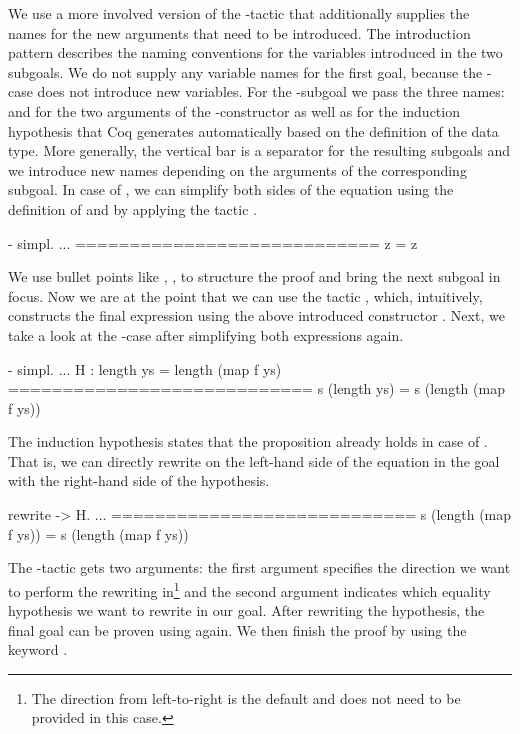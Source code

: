 We use a more involved version of the \--tactic that additionally supplies the names for the new arguments that need to be introduced.
The introduction pattern \cinl{[ | y ys H ]} describes the naming conventions for the variables introduced in the two subgoals.
We do not supply any variable names for the first goal, because the \--case does not introduce new variables.
For the \--subgoal we pass the three names:  and  for the two arguments of the \--constructor as well as  for the induction hypothesis that Coq generates automatically based on the definition of the  data type.
More generally, the vertical bar is a separator for the resulting subgoals and we introduce new names depending on the arguments of the corresponding subgoal.
In case of , we can simplify both sides of the equation using the definition of  and  by applying the tactic .

\begin{cproof}{- simpl.}
  ...
  ============================
  z = z
\end{cproof}

We use bullet points like \cinl{-}, \cinl{+}, \cinl{*} to structure the proof and bring the next subgoal in focus.
Now we are at the point that we can use the tactic , which, intuitively, constructs the final expression using the above introduced constructor .
Next, we take a look at the \--case after simplifying both expressions again.

\begin{cproof}{- simpl.}
  ...
  H : length ys = length (map f ys)
  ============================
  s (length ys) = s (length (map f ys))
\end{cproof}

The induction hypothesis  states that the proposition already holds in case of .
That is, we can directly rewrite  on the left\--hand side of the equation in the goal with the right\--hand side of the hypothesis.

\begin{cproof}{rewrite -> H.}
  ...
  ============================
  s (length (map f ys)) =
  s (length (map f ys))
\end{cproof}

The \--tactic gets two arguments: the first argument specifies the direction we want to perform the rewriting in\footnote{The direction from left\--to\--right is the default and does not need to be provided in this case.} and the second argument indicates which equality hypothesis we want to rewrite in our goal.
After rewriting the hypothesis, the final goal can be proven using  again.
We then finish the proof by using the keyword .

